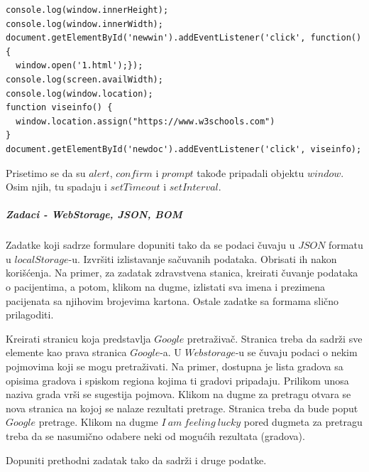 \begin{lstlisting}[backgroundcolor = \color{lightgray}, breaklines=true]
console.log(window.innerHeight);
console.log(window.innerWidth);
document.getElementById('newwin').addEventListener('click', function(){
  window.open('1.html');});
console.log(screen.availWidth); 
console.log(window.location);
function viseinfo() {	
  window.location.assign("https://www.w3schools.com")
}
document.getElementById('newdoc').addEventListener('click', viseinfo);
\end{lstlisting}

Prisetimo se da su $alert$, $confirm$ i $prompt$ takođe pripadali objektu $window$. Osim njih, tu spadaju i $setTimeout$ i $setInterval$.

\subparagraph{Zadaci - WebStorage, JSON, BOM}
\begin{primer}
Zadatke koji sadrze formulare dopuniti tako da se podaci čuvaju u $JSON$ formatu u $localStorage$-u. Izvršiti izlistavanje sačuvanih podataka. Obrisati ih nakon korišćenja. Na primer, za zadatak zdravstvena stanica, kreirati čuvanje podataka o pacijentima, a potom, klikom na dugme, izlistati sva imena i prezimena pacijenata sa njihovim brojevima kartona. Ostale zadatke sa formama slično prilagoditi. 
\end{primer}

\begin{primer}
Kreirati stranicu koja predstavlja $Google$ pretraživač. Stranica treba da sadrži sve elemente kao prava stranica $Google$-a. U $Web storage$-u se čuvaju podaci o nekim pojmovima koji se mogu pretraživati. Na primer, dostupna je lista gradova sa opisima gradova i spiskom regiona kojima ti gradovi pripadaju. Prilikom unosa naziva grada vrši se sugestija pojmova. Klikom na dugme za pretragu otvara se nova stranica na kojoj se nalaze rezultati pretrage. Stranica treba da bude poput $Google$ pretrage. Klikom na dugme $I\ am\ feeling\ lucky$ pored dugmeta za pretragu treba da se nasumično odabere neki od mogućih rezultata (gradova). 
\end{primer}

\begin{primer}
Dopuniti prethodni zadatak tako da sadrži i druge podatke. 
\end{primer}







